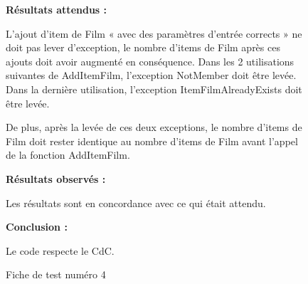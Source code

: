 \documentclass[12pt,a4paper]{report}
\begin{document}
\begin{figure}
\textbf{Résultats attendus :}

L’ajout d’item de Film « avec des paramètres d’entrée corrects » ne doit pas lever d’exception, le nombre d’items de Film après ces ajouts doit avoir augmenté en conséquence.
Dans les 2 utilisations suivantes de AddItemFilm, l’exception NotMember doit être levée.
Dans la dernière utilisation, l’exception ItemFilmAlreadyExists doit être levée.

De plus, après la levée de ces deux exceptions, le nombre d’items de Film doit rester identique au nombre d’items de Film avant l’appel de la fonction AddItemFilm.

\textbf{Résultats observés :}

Les résultats sont en concordance avec ce qui était attendu.

\textbf{Conclusion :}

Le code respecte le CdC.

\caption{Fiche de test numéro 4}
\end{figure}
\end{document}
